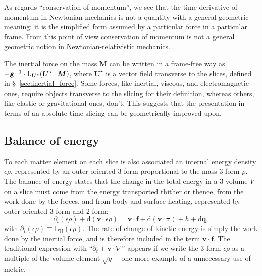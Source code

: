 \documentclass[\ifafour a4paper,12pt,\else a5paper,10pt,\fi%
onecolumn,oneside,article,%
british%
]{memoir}
\theoremstyle{remark}
\theoremstyle{innote}
\newcommand*{\mathte}[1]{\textbf{\textit{\textsf{#1}}}}
\newcommand*{\de}{\partialup}%
\newcommand*{\di}{\mathrm{d}}%
\renewcommand*{\|}{\nonscript\,\vert\nonscript\;\mathopen{}}
\newcommand*{\sect}{\S}%
\newcommand*{\Li}{\mathrm{L}}
\newcommand*{\ydd}{\rho}
\newcommand*{\yd}{\ydd}
\newcommand*{\yrr}{M}
\newcommand*{\yr}{\bm{\yrr}}
\newcommand*{\yQ}{h}
\newcommand*{\yqq}{q}
\newcommand*{\yq}{\bm{\yqq}}
\newcommand*{\yTT}{\tau}
\newcommand*{\yT}{\bm{\yTT}}
\newcommand*{\ybb}{f}
\newcommand*{\yb}{\bm{\ybb}}
\newcommand*{\yvvt}{v}
\newcommand*{\yvt}{\bm{\yvvt}}
\newcommand*{\yFF}{U}
\newcommand*{\yF}{\bm{\yFF}}
\newcommand*{\yFi}{\yF^{\mathord{\star}}}
\newcommand*{\ygg}{g}
\newcommand*{\yg}{\mathte{\ygg}}
\newcommand*{\ygv}{\sqrt{\ygg}}
\newcommand*{\ye}{\epsilon}
\newcommand*{\ynab}{\nabla}
\newcommand*{\yvo}{V}
\begin{document}
As regards \enquote{conservation of momentum}, we see that the
time-derivative of momentum in Newtonian mechanics is not a quantity with a
general geometric meaning: it is the simplified form assumed by a
particular force in a particular frame. From this point of view
conservation of momentum is not a general geometric notion in
Newtonian-relativistic mechanics.




The inertial force on the mass $\yr$ can be written in a frame-free way as
$-\yg^{-1}\cdot \Li_{\yFi}(\yFi\cdot\yr)$, where $\yFi$ is a vector field
transverse to the slices, defined in \sect~\ref{sec:inertial_force}. Some
forces, like inertial, viscous, and electromagnetic ones, require objects
transverse to the slicing for their definition, whereas others, like
elastic or gravitational ones, don't. This suggests that the presentation
in terms of an absolute-time slicing can be geometrically improved upon.


\subsection{Balance of energy}
\label{sec:energy_balance}

To each matter element on each slice is also associated an internal energy
density $\ye\yd$, represented by an outer-oriented 3-form proportional to
the mass 3-form $\yd$. The balance of energy states that the change in the
total energy in a 3-volume $\yvo$ on a slice must come from the energy
transported thither or thence, from the work done by the forces, and from
body and surface heating, represented by outer-oriented 3-form and 2-form:
\begin{equation}
  \label{eq:balance_energy_traditional}
  \de_t(\ye\yd) + \di(\yvt \cdot \ye\yd) =
  \yvt\cdot\yb + \di(\yvt\cdot \yT)
  +\yQ + \di\yq,
\end{equation}
with $\de_t(\ye\yd) \equiv \Li_{\yF}(\ye\yd)$. The rate of change of
kinetic energy is simply the work done by the inertial force, and is
therefore included in the term $\yvt \cdot \yb$. The traditional expression
with \enquote{$\de_t + \yvt\cdot\ynab$} appears if we write the 3-form
$\ye\yd$ as a multiple of the volume element $\ygv$ -- one more example of
a unnecessary use of metric.
\end{document}
